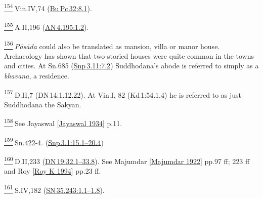 \label{footprints_split_024.html_fn154}
\hyperref[footprints_split_008.htmlux5cux23fnref154]{\textsuperscript{154}} Vin.IV,74
(\href{https://suttacentral.net/pli-tv-bu-vb-pc32/en/brahmali\#8.1}{Bu\,Pc\,32:8.1}).

\label{footprints_split_024.html_fn155}
\hyperref[footprints_split_008.htmlux5cux23fnref155]{\textsuperscript{155}} A.II,196
(\href{https://suttacentral.net/an4.195/en/sujato\#1.2}{AN\,4.195:1.2}).

\label{footprints_split_024.html_fn156}
\hyperref[footprints_split_008.htmlux5cux23fnref156]{\textsuperscript{156}} \emph{Pāsāda}
could also be translated as mansion, villa or manor house. Archaeology
has shown that two-storied houses were quite common in the towns and
cities. At Sn.685
(\href{https://suttacentral.net/snp3.11/en/sujato\#7.2}{Snp\,3.11:7.2})
Suddhodana's abode is referred to simply as a \emph{bhavana}, a
residence.

\label{footprints_split_024.html_fn157}
\hyperref[footprints_split_008.htmlux5cux23fnref157]{\textsuperscript{157}} D.II,7
(\href{https://suttacentral.net/dn14/en/sujato\#1.12.22}{DN\,14:1.12.22}).
At Vin.I, 82
(\href{https://suttacentral.net/pli-tv-kd1/en/brahmali\#54.1.4}{Kd\,1:54.1.4})
he is referred to as just Suddhodana the Sakyan.

\label{footprints_split_024.html_fn158}
\hyperref[footprints_split_008.htmlux5cux23fnref158]{\textsuperscript{158}} See
{Jayaswal
{{[}\hyperref[footprints_split_022.htmlux5cux23Jayaswalux5cux25201934]{Jayaswal
1934}{]}}} p.11.

\label{footprints_split_024.html_fn159}
\hyperref[footprints_split_008.htmlux5cux23fnref159]{\textsuperscript{159}} Sn.422-4.
(\href{https://suttacentral.net/snp3.1/en/sujato\#15.1}{Snp\,3.1:15.1--20.4})

\label{footprints_split_024.html_fn160}
\hyperref[footprints_split_008.htmlux5cux23fnref160]{\textsuperscript{160}} D.II,233
(\href{https://suttacentral.net/dn19/en/sujato\#32.1}{DN\,19:32.1--33.8}).
See {Majumdar
{{[}\hyperref[footprints_split_022.htmlux5cux23Majumdarux5cux25201922]{Majumdar
1922}{]}}} pp.97 ff; 223 ff and {Roy
{{[}\hyperref[footprints_split_022.htmlux5cux23Royux5cux2520Kux5cux25201994]{Roy
K 1994}{]}}} pp.23 ff.

\label{footprints_split_024.html_fn161}
\hyperref[footprints_split_008.htmlux5cux23fnref161]{\textsuperscript{161}} S.IV,182
(\href{https://suttacentral.net/sn35.243/en/sujato\#1.1}{SN\,35.243:1.1--1.8}).

